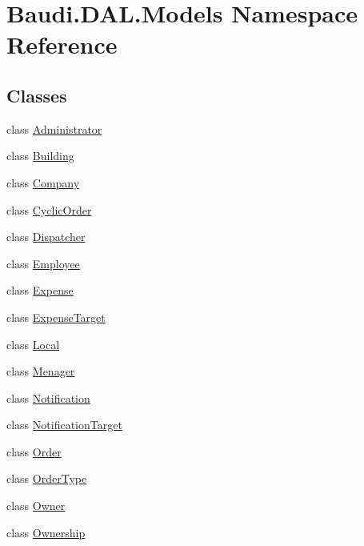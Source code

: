 \hypertarget{namespace_baudi_1_1_d_a_l_1_1_models}{}\section{Baudi.\+D\+A\+L.\+Models Namespace Reference}
\label{namespace_baudi_1_1_d_a_l_1_1_models}
\subsection*{Classes}
\begin{DoxyCompactItemize}
\item 
class \hyperlink{class_baudi_1_1_d_a_l_1_1_models_1_1_administrator}{Administrator}
\item 
class \hyperlink{class_baudi_1_1_d_a_l_1_1_models_1_1_building}{Building}
\item 
class \hyperlink{class_baudi_1_1_d_a_l_1_1_models_1_1_company}{Company}
\item 
class \hyperlink{class_baudi_1_1_d_a_l_1_1_models_1_1_cyclic_order}{Cyclic\+Order}
\item 
class \hyperlink{class_baudi_1_1_d_a_l_1_1_models_1_1_dispatcher}{Dispatcher}
\item 
class \hyperlink{class_baudi_1_1_d_a_l_1_1_models_1_1_employee}{Employee}
\item 
class \hyperlink{class_baudi_1_1_d_a_l_1_1_models_1_1_expense}{Expense}
\item 
class \hyperlink{class_baudi_1_1_d_a_l_1_1_models_1_1_expense_target}{Expense\+Target}
\item 
class \hyperlink{class_baudi_1_1_d_a_l_1_1_models_1_1_local}{Local}
\item 
class \hyperlink{class_baudi_1_1_d_a_l_1_1_models_1_1_menager}{Menager}
\item 
class \hyperlink{class_baudi_1_1_d_a_l_1_1_models_1_1_notification}{Notification}
\item 
class \hyperlink{class_baudi_1_1_d_a_l_1_1_models_1_1_notification_target}{Notification\+Target}
\item 
class \hyperlink{class_baudi_1_1_d_a_l_1_1_models_1_1_order}{Order}
\item 
class \hyperlink{class_baudi_1_1_d_a_l_1_1_models_1_1_order_type}{Order\+Type}
\item 
class \hyperlink{class_baudi_1_1_d_a_l_1_1_models_1_1_owner}{Owner}
\item 
class \hyperlink{class_baudi_1_1_d_a_l_1_1_models_1_1_ownership}{Ownership}

\end{DoxyCompactItemize}
